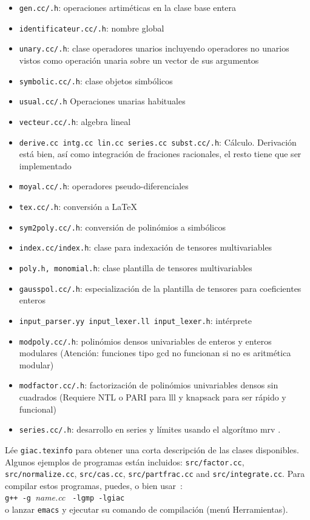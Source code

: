 \documentclass{article}
\begin{document}
\begin{itemize}
\item \verb|gen.cc/.h|: operaciones artim\'eticas en la clase base entera
\item \verb|identificateur.cc/.h|: nombre global 
\item \verb|unary.cc/.h|: clase operadores unarios incluyendo operadores no unarios vistos como operaci\'on unaria sobre un vector de sus argumentos
\item \verb|symbolic.cc/.h|: clase objetos simb\'olicos
\item \verb|usual.cc/.h| Operaciones unarias habituales
\item \verb|vecteur.cc/.h|: algebra lineal
\item \verb|derive.cc intg.cc lin.cc series.cc subst.cc/.h|: C\'alculo. Derivaci\'on est\'a bien, as\'i como integraci\'on de fraciones racionales, el resto tiene que ser implementado
\item \verb|moyal.cc/.h|: operadores pseudo-diferenciales
\item \verb|tex.cc/.h|: conversi\'on a \LaTeX\ 
\item \verb|sym2poly.cc/.h|: conversi\'on de polin\'omios a simb\'olicos
\item \verb|index.cc/index.h|: clase para indexaci\'on de tensores multivariables
\item \verb|poly.h, monomial.h|: clase plantilla de tensores multivariables
\item \verb|gausspol.cc/.h|: especializaci\'on de la plantilla de tensores para coeficientes enteros
\item \verb|input_parser.yy input_lexer.ll input_lexer.h|: int\'erprete
\item \verb|modpoly.cc/.h|: polin\'omios densos univariables de enteros y enteros modulares (Atenci\'on: funciones tipo gcd no funcionan si no es aritm\'etica modular)
\item \verb|modfactor.cc/.h|: 
factorizaci\'on de polin\'omios univariables densos sin cuadrados
(Requiere NTL o PARI para lll y knapsack para ser r\'apido y funcional)
\item \verb|series.cc/.h|: 
desarrollo en series y l\'imites usando el algor\'itmo mrv .
\end{itemize}

L\'ee {\tt giac.texinfo} para obtener una corta descripci\'on de las clases disponibles.
Algunos ejemplos de programas est\'an incluidos: {\tt src/factor.cc}, 
{\tt src/normalize.cc},
{\tt src/cas.cc}, {\tt src/partfrac.cc} and {\tt src/integrate.cc}.
Para compilar estos programas, puedes, o bien usar~:\\
\verb|g++ -g |{\em name.cc\/} \verb| -lgmp -lgiac|\\
o lanzar \verb|emacs| y ejecutar su comando de compilaci\'on (men\'u Herramientas).
\end{document}
